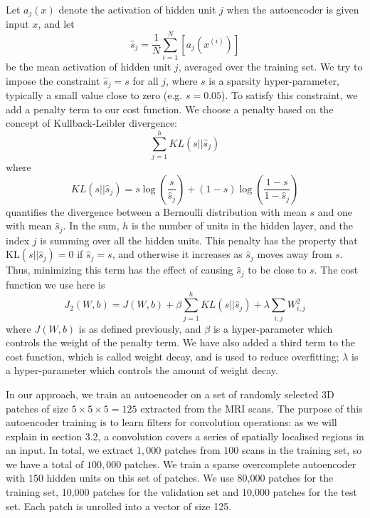 \documentclass[a4paper,10pt]{article}
\begin{document}
Let $a_{j}(x)$ denote the activation of hidden unit $j$ when the autoencoder is given input $x$, and let
\begin{equation}
\hat{s}_{j} = \frac{1}{N}\sum_{i=1}^{N}\left[a_{j}(x^{(i)})\right]
\end{equation}
be the mean activation of hidden unit $j$, averaged over the training set. We try to impose the constraint $\hat{s}_{j} = s$ for all $j$, where $s$ is a sparsity hyper-parameter, typically a small value close to zero (e.g. $s = 0.05$). To satisfy this constraint, we add a penalty term to our cost function. We choose a penalty based on the concept of Kullback-Leibler divergence:
\begin{equation}
\sum_{j=1}^{h}KL(s||\hat{s}_{j})
\end{equation}
where
\begin{equation}
KL(s||\hat{s}_{j}) = s\log(\frac{s}{\hat{s}_{j}}) + (1-s)\log(\frac{1-s}{1-\hat{s}_{j}})
\end{equation}
quantifies the divergence between a Bernoulli distribution with mean $s$ and one with mean $\hat{s}_{j}$. In the sum, $h$ is the number of units in the hidden layer, and the index $j$ is summing over all the hidden units. This penalty has the property that $\text{KL}(s||\hat{s}_{j}) = 0$ if $\hat{s}_{j} = s$, and otherwise it increases as $\hat{s}_{j}$ moves away from $s$. Thus, minimizing this term has the effect of causing $\hat{s}_{j}$ to be close to $s$. The cost function we use here is
\begin{equation}
J_{2}(W,b) = J(W,b) + \beta\sum_{j=1}^{h}KL(s||\hat{s}_{j}) + \lambda\sum_{i,j}W_{i,j}^{2}
\end{equation}
where $J(W,b)$ is as defined previously, and $\beta$  is a hyper-parameter which controls the weight of the penalty term. We have also added a third term to the cost function, which is called weight decay, and is used to reduce overfitting; $\lambda$ is a hyper-parameter which controls the amount of weight decay.

In our approach, we train an autoencoder on a set of randomly selected 3D patches of size $5 \times 5 \times 5 = 125$ extracted from the MRI scans. The purpose of this autoencoder training is to learn filters for convolution operations: as we will explain in section 3.2, a convolution covers a series of spatially localised regions in an input. In total, we extract $1,000$ patches from $100$ scans in the training set, so we have a total of $100,000$ patches. We train a sparse overcomplete autoencoder with $150$ hidden units on this set of patches. We use 80,000 patches for the training set, 10,000 patches for the validation set and 10,000 patches for the test set. Each patch is unrolled into a vector of size 125.
\end{document}
